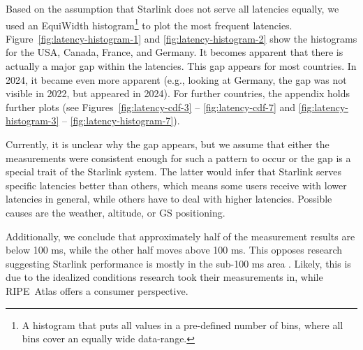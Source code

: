 Based on the assumption that Starlink does not serve all latencies equally, we
used an EquiWidth histogram\footnote{A histogram that puts all values in a
	pre-defined number of bins, where all bins cover an equally wide
	data-range.} to plot the most frequent latencies.
Figure~\ref{fig:latency-histogram-1} and \ref{fig:latency-histogram-2}
show the histograms for the USA, Canada, France, and Germany. It
becomes apparent that there is actually a major gap within the latencies. This
gap appears for most countries. In 2024, it became even more apparent (e.g.,
looking at Germany, the gap was not visible in 2022, but appeared in 2024). For
further countries, the appendix holds further plots (see
Figures~\ref{fig:latency-cdf-3} -- \ref{fig:latency-cdf-7} and
\ref{fig:latency-histogram-3} -- \ref{fig:latency-histogram-7}).

Currently, it is unclear why the gap appears, but we assume that either
the measurements were consistent enough for such a pattern to occur or the gap
is a special trait of the Starlink system. The latter would infer that Starlink
serves specific latencies better than others, which means some users receive
with lower latencies in general, while others have to deal with higher
latencies. Possible causes are the weather, altitude, or \ac{GS} positioning.

Additionally, we conclude that approximately half of the measurement results
are below 100 ms, while the other half moves above 100 ms. This opposes
research suggesting Starlink performance is mostly in the sub-100 ms area
\cite{DBLP:conf/www/MohanFCBRMO24, DBLP:conf/icnp/LaiLL20,
	DBLP:journals/pacmnet/RamanVCSZ23, DBLP:conf/imc/MichelTGB22}. Likely,
this is due to the idealized conditions research took their
measurements in, while RIPE~Atlas offers a consumer perspective.

